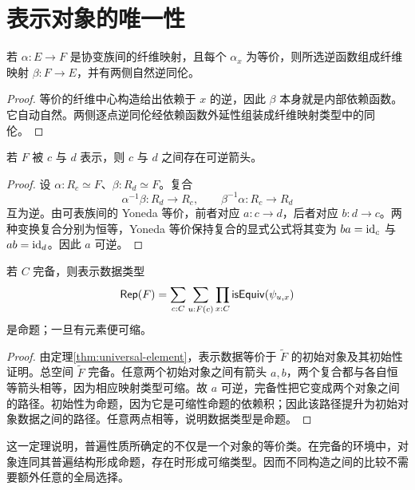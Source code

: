 \section{表示对象的唯一性}
\begin{lemma}[自然等价的逐纤维逆]
若 $\alpha:E\to F$ 是协变族间的纤维映射，且每个 $\alpha_x$ 为等价，则所选逆函数组成纤维映射 $\beta:F\to E$，并有两侧自然逆同伦。
\end{lemma}
\begin{proof}
等价的纤维中心构造给出依赖于 $x$ 的逆，因此 $\beta$ 本身就是内部依赖函数。它自动自然。两侧逐点逆同伦经依赖函数外延性组装成纤维映射类型中的同伦。
\end{proof}
\begin{theorem}[表示唯一到等价]
若 $F$ 被 $c$ 与 $d$ 表示，则 $c$ 与 $d$ 之间存在可逆箭头。
\end{theorem}
\begin{proof}
设 $\alpha:R_c\simeq F$、$\beta:R_d\simeq F$。复合
\[
\alpha^{-1}\beta:R_d\to R_c,
\qquad
\beta^{-1}\alpha:R_c\to R_d
\]
互为逆。由可表族间的 Yoneda 等价，前者对应 $a:c\to d$，后者对应 $b:d\to c$。两种变换复合分别为恒等，Yoneda 等价保持复合的显式公式将其变为 $ba=\operatorname{id}_c$ 与 $ab=\operatorname{id}_d$。因此 $a$ 可逆。
\end{proof}
\begin{proposition}[带普遍结构的唯一性]
若 $C$ 完备，则表示数据类型
\[
\mathsf{Rep}(F)=
\sum_{c:C}\sum_{u:F(c)}
\prod_{x:C}\mathsf{isEquiv}(\psi_{u,x})
\]
是命题；一旦有元素便可缩。
\end{proposition}
\begin{proof}
由定理\ref{thm:universal-element}，表示数据等价于 $\widetilde F$ 的初始对象及其初始性证明。总空间 $\widetilde F$ 完备。任意两个初始对象之间有箭头 $a,b$，两个复合都与各自恒等箭头相等，因为相应映射类型可缩。故 $a$ 可逆，完备性把它变成两个对象之间的路径。初始性为命题，因为它是可缩性命题的依赖积；因此该路径提升为初始对象数据之间的路径。任意两点相等，说明数据类型是命题。
\end{proof}
\begin{remark}
这一定理说明，普遍性质所确定的不仅是一个对象的等价类。在完备的环境中，对象连同其普遍结构形成命题，存在时形成可缩类型。因而不同构造之间的比较不需要额外任意的全局选择。
\end{remark}

